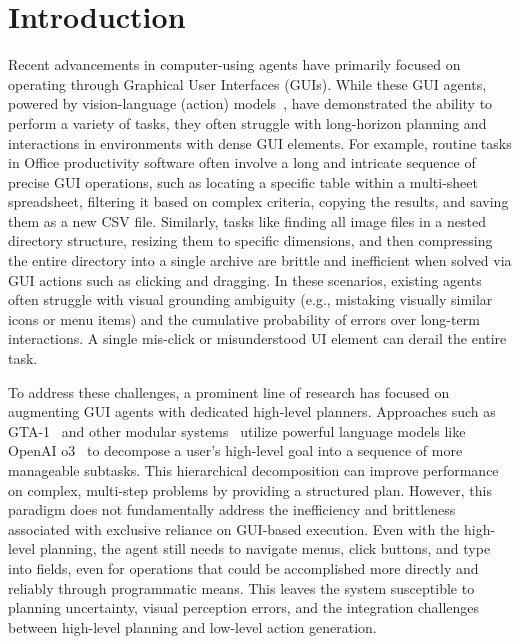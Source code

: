 \documentclass{article} %
\begin{document}
\section{Introduction}
Recent advancements in computer-using agents have primarily focused on operating through Graphical User Interfaces (GUIs). While these GUI agents, powered by vision-language (action) models~\citep{blip2,gemini2,gemini25,openai2024gpt4ocard, cua2025, qin2025ui, xie2025scalingcomputerusegroundinguser, yang2025gta1guitesttimescaling}, have demonstrated the ability to perform a variety of tasks, they often struggle with long-horizon planning and interactions in environments with dense GUI elements. For example, routine tasks in Office productivity software often involve a long and intricate sequence of precise GUI operations, such as locating a specific table within a multi-sheet spreadsheet, filtering it based on complex criteria, copying the results, and saving them as a new CSV file. Similarly, tasks like finding all image files in a nested directory structure, resizing them to specific dimensions, and then compressing the entire directory into a single archive are brittle and inefficient when solved via GUI actions such as clicking and dragging. In these scenarios, existing agents often struggle with visual grounding ambiguity (e.g., mistaking visually similar icons or menu items) and the cumulative probability of errors over long-term interactions. A single mis-click or misunderstood UI element can derail the entire task.

To address these challenges, a prominent line of research has focused on augmenting GUI agents with dedicated high-level planners. Approaches such as GTA-1~\citep{yang2025gta1guitesttimescaling} and other modular systems~\citep{yang2024aria, xu2024aguvis, agashe2024agent, agashe2025agent} utilize powerful language models like OpenAI o3~\citep{openAI_o3_o4_mini} to decompose a user's high-level goal into a sequence of more manageable subtasks. This hierarchical decomposition can improve performance on complex, multi-step problems by providing a structured plan. However, this paradigm does not fundamentally address the inefficiency and brittleness associated with exclusive reliance on GUI-based execution. Even with the high-level planning, the agent still needs to navigate menus, click buttons, and type into fields, even for operations that could be accomplished more directly and reliably through programmatic means. This leaves the system susceptible to planning uncertainty, visual perception errors, and the integration challenges between high-level planning and low-level action generation.
\end{document}
